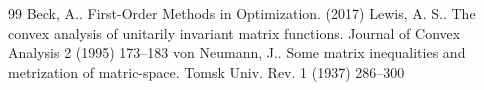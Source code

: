 \documentclass[10pt,a4paper]{amsart}
\begin{document}
\begin{thebibliography}{99}
 Beck, A.. First-Order Methods in Optimization. (2017)
 Lewis, A. S.. The convex analysis of unitarily invariant matrix functions. Journal of Convex Analysis 2 (1995) 173--183
 von Neumann, J.. Some matrix inequalities and metrization of matric-space. Tomsk Univ. Rev. 1 (1937) 286--300
\end{thebibliography}
\end{document}
